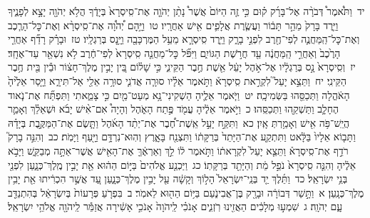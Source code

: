 \documentclass[18pt]{article}
\newcommand{\vart}[1]{\Bfootnote{#1}}	%
\begin{document}
 {\loc יד~}וַתֹּ֩אמֶר֩ דְּבֹרָ֨ה אֶל־בָּרָ֜ק ק֗וּם כִּ֣י זֶ֤ה הַיּוֹם֙ אֲשֶׁר֩ נָתַ֨ן יְהֹוָ֤ה אֶת־סִֽיסְרָא֙ בְּיָדֶ֔ךָ הֲלֹ֥א יְהֹוָ֖ה יָצָ֣א לְפָנֶ֑יךָ וַיֵּ֤רֶד בָּרָק֙ מֵהַ֣ר תָּב֔וֹר וַעֲשֶׂ֧רֶת אֲלָפִ֛ים אִ֖ישׁ אַחֲרָֽיו׃ \startlock
 {\loc טו~}וַיָּ֣הׇם יְ֠הֹוָ֠ה אֶת־סִֽיסְרָ֨א וְאֶת־כׇּל־הָרֶ֧כֶב וְאֶת־כׇּל־הַֽמַּחֲנֶ֛ה לְפִי־חֶ֖רֶב לִפְנֵ֣י בָרָ֑ק וַיֵּ֧רֶד סִֽיסְרָ֛א מֵעַ֥ל הַמֶּרְכָּבָ֖ה וַיָּ֥נׇס בְּרַגְלָֽיו׃ \startlock
 {\loc טז~}וּבָרָ֗ק רָדַ֞ף אַחֲרֵ֤י הָרֶ֙כֶב֙ וְאַחֲרֵ֣י הַֽמַּחֲנֶ֔ה עַ֖ד חֲרֹ֣שֶׁת הַגּוֹיִ֑ם וַיִּפֹּ֞ל כׇּל־מַחֲנֵ֤ה סִֽיסְרָא֙ לְפִי־חֶ֔רֶב לֹ֥א נִשְׁאַ֖ר עַד־אֶחָֽד׃ \startlock
 {\loc יז~}וְסִֽיסְרָא֙ נָ֣ס בְּרַגְלָ֔יו אֶל־אֹ֣הֶל יָעֵ֔ל אֵ֖שֶׁת חֶ֣בֶר הַקֵּינִ֑י כִּ֣י שָׁל֗וֹם בֵּ֚ין יָבִ֣ין מֶלֶךְ־חָצ֔וֹר וּבֵ֕ין בֵּ֖ית חֶ֥בֶר הַקֵּינִֽי׃ \startlock
 {\loc יח~}וַתֵּצֵ֣א יָעֵל֮ לִקְרַ֣את סִֽיסְרָא֒ וַתֹּ֣אמֶר אֵלָ֗יו סוּרָ֧ה אֲדֹנִ֛י סוּרָ֥ה אֵלַ֖י אַל־תִּירָ֑א וַיָּ֤סַר אֵלֶ֙יהָ֙ הָאֹ֔הֱלָה וַתְּכַסֵּ֖הוּ בַּשְּׂמִיכָֽה׃ \startlock
 {\loc יט~}וַיֹּ֧אמֶר אֵלֶ֛יהָ הַשְׁקִינִי־נָ֥א מְעַט־מַ֖יִם כִּ֣י צָמֵ֑אתִי וַתִּפְתַּ֞ח אֶת־נֹ֧אוד הֶחָלָ֛ב וַתַּשְׁקֵ֖הוּ וַתְּכַסֵּֽהוּ׃ \startlock
 {\loc כ~}וַיֹּ֣אמֶר אֵלֶ֔יהָ עֲמֹ֖ד פֶּ֣תַח הָאֹ֑הֶל וְהָיָה֩ אִם־אִ֨ישׁ יָבֹ֜א וּשְׁאֵלֵ֗ךְ וְאָמַ֛ר הֲיֵֽשׁ־פֹּ֥ה אִ֖ישׁ וְאָמַ֥רְתְּ אָֽיִן׃ \startlock
 {\loc כא~}וַתִּקַּ֣ח יָעֵ֣ל אֵֽשֶׁת־חֶ֠בֶר אֶת־יְתַ֨ד הָאֹ֜הֶל וַתָּ֧שֶׂם אֶת־הַמַּקֶּ֣בֶת בְּיָדָ֗הּ וַתָּב֤וֹא אֵלָיו֙ בַּלָּ֔אט וַתִּתְקַ֤ע אֶת־הַיָּתֵד֙ בְּרַקָּת֔וֹ וַתִּצְנַ֖ח בָּאָ֑רֶץ וְהֽוּא־נִרְדָּ֥ם וַיָּ֖עַף וַיָּמֹֽת׃ \startlock
 {\loc כב~}וְהִנֵּ֣ה בָרָק֮ רֹדֵ֣ף אֶת־סִֽיסְרָא֒ וַתֵּצֵ֤א יָעֵל֙ לִקְרָאת֔וֹ וַתֹּ֣אמֶר ל֔וֹ לֵ֣ךְ וְאַרְאֶ֔ךָּ אֶת־הָאִ֖ישׁ אֲשֶׁר־אַתָּ֣ה מְבַקֵּ֑שׁ וַיָּבֹ֣א אֵלֶ֔יהָ וְהִנֵּ֤ה סִֽיסְרָא֙ נֹפֵ֣ל מֵ֔ת וְהַיָּתֵ֖ד בְּרַקָּתֽוֹ׃ \startlock
 {\loc כג~}וַיַּכְנַ֤ע אֱלֹהִים֙ בַּיּ֣וֹם הַה֔וּא אֵ֖ת יָבִ֣ין מֶֽלֶךְ־כְּנָ֑עַן לִפְנֵ֖י בְּנֵ֥י יִשְׂרָאֵֽל׃ \startlock
 {\loc כד~}וַתֵּ֜לֶךְ יַ֤ד בְּנֵֽי־יִשְׂרָאֵל֙ הָל֣וֹךְ וְקָשָׁ֔ה עַ֖ל יָבִ֣ין מֶלֶךְ־כְּנָ֑עַן עַ֚ד אֲשֶׁ֣ר הִכְרִ֔יתוּ אֵ֖ת יָבִ֥ין מֶלֶךְ־כְּנָֽעַן׃ 
\startlock
 {\loc א~}וַתָּ֣שַׁר דְּבוֹרָ֔ה וּבָרָ֖ק בֶּן־אֲבִינֹ֑עַם      בַּיּ֥וֹם הַה֖וּא לֵאמֹֽר׃ \startlock
 {\loc ב~}בִּפְרֹ֤עַ פְּרָעוֹת֙ בְּיִשְׂרָאֵ֔ל      בְּהִתְנַדֵּ֖ב עָ֑ם  \edtext{בָּֽרְכ֖וּ}{\vart{א=בָּֽרֲכ֖וּ (חטף) | }}  יְהֹוָֽה׃ \startlock
 {\loc ג~}שִׁמְע֣וּ מְלָכִ֔ים הַאֲזִ֖ינוּ רֹֽזְנִ֑ים      אָנֹכִ֗י לַֽיהֹוָה֙ אָנֹכִ֣י אָשִׁ֔ירָה      אֲזַמֵּ֕ר לַֽיהֹוָ֖ה אֱלֹהֵ֥י יִשְׂרָאֵֽל׃ \startlock
\end{document}
